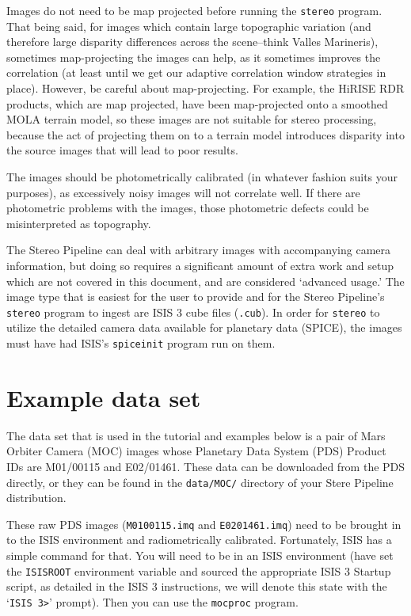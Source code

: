 Images do not need to be map projected before running the \texttt{stereo}
program. That being said, for images which contain large topographic
variation (and therefore large disparity differences across the
scene--think Valles Marineris), sometimes map-projecting the images
can help, as it sometimes improves the correlation (at least until
we get our adaptive correlation window strategies in place).  However,
be careful about map-projecting.  For example, the HiRISE RDR
products, which are map projected, have been map-projected onto a
smoothed MOLA terrain model, so these images are not suitable for
stereo processing, because the act of projecting them on to a terrain
model introduces disparity into the source images that will lead
to poor results.

The images should be photometrically calibrated (in whatever fashion
suits your purposes), as excessively noisy images will not correlate
well.  If there are photometric problems with the images, those
photometric defects could be misinterpreted as topography.

The Stereo Pipeline can deal with arbitrary images with accompanying
camera information, but doing so requires a significant amount of
extra work and setup which are not covered in this document, and
are considered `advanced usage.'  The image type that is easiest
for the user to provide and for the Stereo Pipeline's \texttt{stereo}
program to ingest are ISIS 3 cube files (\texttt{.cub}).  In order
for \texttt{stereo} to utilize the detailed camera data available
for planetary data (SPICE), the images must have had ISIS's
\texttt{spiceinit} program run on them.


\section{Example data set}

The data set that is used in the tutorial and examples below is a
pair of Mars Orbiter Camera (MOC)
\citep{1992JGR....97.7699M,2001JGR...10623429M} images whose Planetary
Data System (PDS) Product IDs are M01/00115 and E02/01461.
These data can be downloaded from the PDS directly, or they can be found in
the \texttt{data/MOC/} directory of your Stere Pipeline distribution.

These raw PDS images (\texttt{M0100115.imq} and \texttt{E0201461.imq})
need to be brought in to the ISIS environment and radiometrically
calibrated.  Fortunately, ISIS has a simple command for that.  You
will need to be in an ISIS environment (have set the \texttt{ISISROOT}
environment variable and sourced the appropriate ISIS 3 Startup
script, as detailed in the ISIS 3 instructions, we will denote this
state with the `\texttt{ISIS 3>}' prompt).  Then you can use the
\texttt{mocproc} program.

